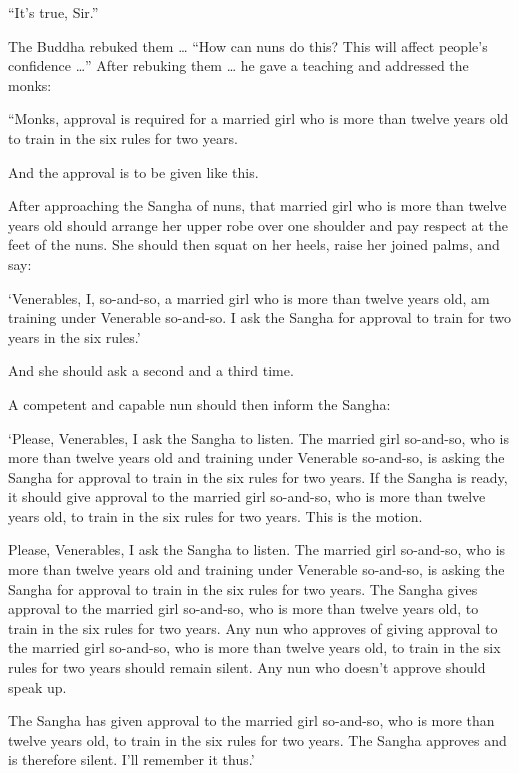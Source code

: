 \documentclass[12pt,openany]{book}%
\begin{document}
“It’s true, Sir.” 

The Buddha rebuked them … “How can nuns do this? This will affect people’s confidence …” After rebuking them … he gave a teaching and addressed the monks: 

“Monks, approval is required for a married girl who is more than twelve years old to train in the six rules for two years. 

And the approval is to be given like this. 

After approaching the Sangha of nuns, that married girl who is more than twelve years old should arrange her upper robe over one shoulder and pay respect at the feet of the nuns. She should then squat on her heels, raise her joined palms, and say: 

‘Venerables, I, so-and-so, a married girl who is more than twelve years old, am training under Venerable so-and-so. I ask the Sangha for approval to train for two years in the six rules.’ 

And she should ask a second and a third time. 

A competent and capable nun should then inform the Sangha: 

‘Please, Venerables, I ask the Sangha to listen. The married girl so-and-so, who is more than twelve years old and training under Venerable so-and-so, is asking the Sangha for approval to train in the six rules for two years. If the Sangha is ready, it should give approval to the married girl so-and-so, who is more than twelve years old, to train in the six rules for two years. This is the motion. 

Please, Venerables, I ask the Sangha to listen. The married girl so-and-so, who is more than twelve years old and training under Venerable so-and-so, is asking the Sangha for approval to train in the six rules for two years. The Sangha gives approval to the married girl so-and-so, who is more than twelve years old, to train in the six rules for two years. Any nun who approves of giving approval to the married girl so-and-so, who is more than twelve years old, to train in the six rules for two years should remain silent. Any nun who doesn’t approve should speak up. 

The Sangha has given approval to the married girl so-and-so, who is more than twelve years old, to train in the six rules for two years. The Sangha approves and is therefore silent. I’ll remember it thus.’ 
\end{document}

